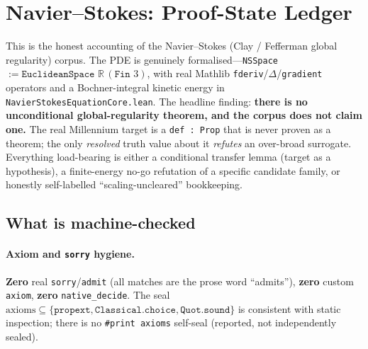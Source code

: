 %

\section{Navier--Stokes: Proof-State Ledger}
\label{sec:ns-proofstate}

This is the honest accounting of the Navier--Stokes (Clay / Fefferman global
regularity) corpus. The PDE is genuinely formalised---\texttt{NSSpace} $:=
\texttt{EuclideanSpace }\mathbb{R}\,(\texttt{Fin }3)$, with real Mathlib
\texttt{fderiv}/$\Delta$/\texttt{gradient} operators and a Bochner-integral
kinetic energy in \texttt{NavierStokesEquationCore.lean}. The headline finding:
\textbf{there is no unconditional global-regularity theorem, and the corpus does
not claim one.} The real Millennium target is a \texttt{def : Prop} that is
never proven as a theorem; the only \emph{resolved} truth value about it
\emph{refutes} an over-broad surrogate. Everything load-bearing is either a
conditional transfer lemma (target as a hypothesis), a finite-energy no-go
refutation of a specific candidate family, or honestly self-labelled
``scaling-uncleared'' bookkeeping.

\subsection{What is machine-checked}
\label{sec:ns-checked}

\paragraph{Axiom and \texttt{sorry} hygiene.}
\textbf{Zero} real \texttt{sorry}/\texttt{admit} (all matches are the prose word
``admits''), \textbf{zero} custom \texttt{axiom}, \textbf{zero}
\texttt{native\_decide}. The seal
$\text{axioms}\subseteq\{\texttt{propext},\texttt{Classical.choice},\texttt{Quot.sound}\}$
is consistent with static inspection; there is no \texttt{\#print axioms}
self-seal (reported, not independently sealed).

